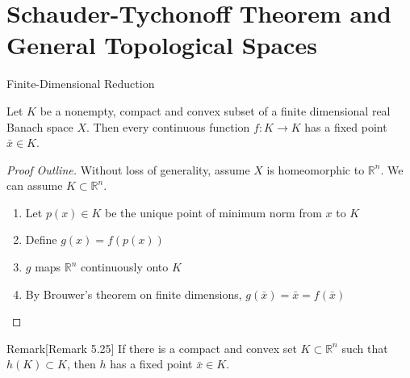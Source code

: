 \documentclass[aspectratio=169,10pt]{beamer}
\begin{document}
\section{Schauder-Tychonoff Theorem and General Topological Spaces}

\begin{frame}[allowframebreaks]{Finite-Dimensional Reduction}
    \begin{lemma}[Lemma 5.8]
        Let $K$ be a nonempty, compact and convex subset of a finite dimensional real Banach space $X$. Then every continuous function $f: K \to K$ has a fixed point $\bar{x} \in K$.
    \end{lemma}

    \begin{proof}[Proof Outline]
        Without loss of generality, assume $X$ is homeomorphic to $\mathbb{R}^n$. We can assume $K \subset \mathbb{R}^n$.
        \begin{enumerate}
            \item Let $p(x) \in K$ be the unique point of minimum norm from $x$ to $K$
            \item Define $g(x) = f(p(x))$
            \item $g$ maps $\mathbb{R}^n$ continuously onto $K$
            \item By Brouwer's theorem on finite dimensions, $g(\bar{x}) = \bar{x} = f(\bar{x})$
        \end{enumerate}
    \end{proof}

    \begin{block}{Remark}[Remark 5.25]
        If there is a compact and convex set $K \subset \mathbb{R}^n$ such that $h(K) \subset K$, then $h$ has a fixed point $\bar{x} \in K$.
    \end{block}
\end{frame}
\end{document}

